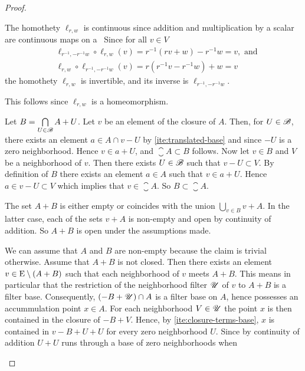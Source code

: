 \begin{proof}
  \begin{adromanlist}
  \item
    The homothety $\ell_{r,w}$ is continuous since addition and multiplication by a scalar
    are continuous maps on a \tvs\ Since for all $v\in V$ 
    \begin{align}
      \nonumber
      & \ell_{r^{-1},-r^{-1}w}\circ \ell_{r,w} (v) = r^{-1} (rv +w) - r^{-1}w = v, \text{ and}\\
      \nonumber
      & \ell_{r,w} \circ \ell_{r^{-1},-r^{-1}w} (v) = r (r^{-1}v  - r^{-1}w) + w = v
    \end{align}
    the homothety $\ell_{r,w}$  is invertible, and its inverse is $\ell_{r^{-1},-r^{-1}w}$.
  \item
    This follows since $\ell_{r,w}$ is a homeomorphism.   
  \item
     Let $B = \bigcap\limits_{U \in \mathscr{B}} A + U$. Let $v$ be an element of the closure of $A$.
     Then, for $U \in \mathscr{B}$, there exists an element $a \in A \cap v - U$ by \ref{ite:translated-base}
     and since $-U$ is a zero neighborhood. Hence $v \in a + U$, and $\closure{A} \subset B$ follows.
     Now let $v \in B$ and $V$ be a neighborhood of $v$. Then there exists $U\in \mathscr{B}$ such that 
     $v -U \subset V$. By definition of $B$ there exists an element $a\in A$ such that $v \in a + U$.
     Hence $a \in v - U \subset V$ which implies that $v \in \closure{A}$.
     So $B \subset \closure{A}$. 
  \item
    The set $A+B$ is either empty or coincides with the union $\bigcup_{v\in B} v + A$.
    In the latter case, each of the sets  $v+ A$ is non-empty and
    open by continuity of addition. So $A+B$ is open under the assumptions made.
  \item
    We can assume that $A$ and $B$ are non-empty because the claim is trivial otherwise.
    Assume that $A+B$ is not closed. Then there exists an element $v \in \mathrm{E} \setminus (A+B) $
    such that each neighborhood of $v$ meets $A+B$. This means in particular that
    the restriction of the neighborhood filter $\mathscr{U}$ of $v$ to $A+B$ is a filter base.
    Consequently, $(- B + \mathscr{U})\cap A$ is a filter base on $A$, hence possesses an
    accummulation point $x \in A$. For each neighborhood $V \in \mathscr{U}$ the point $x$ is then
    contained in the closure of $-B +V$. Hence, by \ref{ite:closure-terms-base},
    $x$ is contained in $v -B + U + U$ for every zero neighborhood $U$.
    Since by continuity of addition $U + U$ runs through a base of zero neighborhoods when

\end{adromanlist}
\end{proof}
